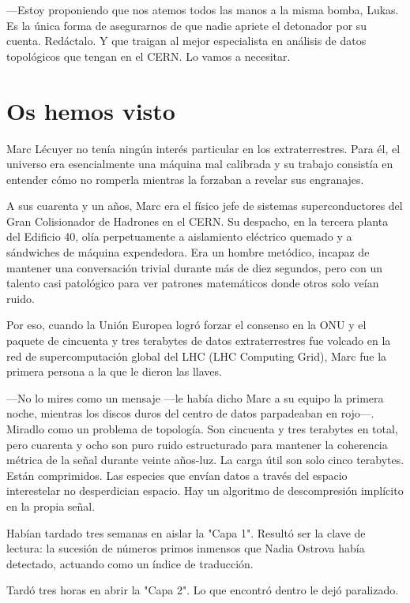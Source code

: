 \documentclass[11pt,a5paper,twoside]{book}
\begin{document}
—Estoy proponiendo que nos atemos todos las manos a la misma bomba, Lukas. Es la única forma de asegurarnos de que nadie apriete el detonador por su cuenta. Redáctalo. Y que traigan al mejor especialista en análisis de datos topológicos que tengan en el CERN. Lo vamos a necesitar.

\chapter{Os hemos visto}

Marc Lécuyer no tenía ningún interés particular en los extraterrestres. Para él, el universo era esencialmente una máquina mal calibrada y su trabajo consistía en entender cómo no romperla mientras la forzaban a revelar sus engranajes.

A sus cuarenta y un años, Marc era el físico jefe de sistemas superconductores del Gran Colisionador de Hadrones en el CERN. Su despacho, en la tercera planta del Edificio 40, olía perpetuamente a aislamiento eléctrico quemado y a sándwiches de máquina expendedora. Era un hombre metódico, incapaz de mantener una conversación trivial durante más de diez segundos, pero con un talento casi patológico para ver patrones matemáticos donde otros solo veían ruido.

Por eso, cuando la Unión Europea logró forzar el consenso en la ONU y el paquete de cincuenta y tres terabytes de datos extraterrestres fue volcado en la red de supercomputación global del LHC (LHC Computing Grid), Marc fue la primera persona a la que le dieron las llaves.

—No lo mires como un mensaje —le había dicho Marc a su equipo la primera noche, mientras los discos duros del centro de datos parpadeaban en rojo—. Miradlo como un problema de topología. Son cincuenta y tres terabytes en total, pero cuarenta y ocho son puro ruido estructurado para mantener la coherencia métrica de la señal durante veinte años-luz. La carga útil son solo cinco terabytes. Están comprimidos. Las especies que envían datos a través del espacio interestelar no desperdician espacio. Hay un algoritmo de descompresión implícito en la propia señal.

Habían tardado tres semanas en aislar la "Capa 1". Resultó ser la clave de lectura: la sucesión de números primos inmensos que Nadia Ostrova había detectado, actuando como un índice de traducción.

Tardó tres horas en abrir la "Capa 2". Lo que encontró dentro le dejó paralizado.
\end{document}
